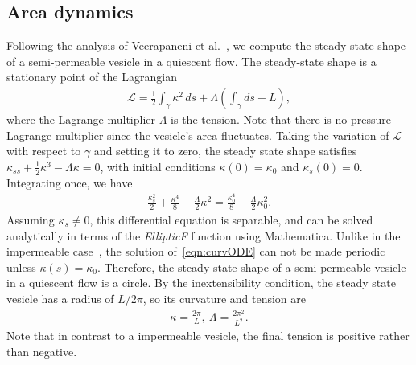 \documentclass[9pt,twocolumn,twoside,lineno]{pnas-new}
\begin{document}
\subsection*{Area dynamics}
Following the analysis of Veerapaneni et al.~\cite{vee-raj-bir-pur2009},
we compute the steady-state shape of a semi-permeable vesicle in a
quiescent flow. The steady-state shape is a stationary point of the
Lagrangian
\begin{align}
  \mathcal{L} = \frac{1}{2}\int_{\gamma} \kappa^2 \, ds +
    \Lambda \left(\int_{\gamma} ds  - L \right),
\end{align}
where the Lagrange multiplier $\Lambda$ is the tension. Note that there
is no pressure Lagrange multiplier since the vesicle's area fluctuates.
Taking the variation of $\mathcal{L}$ with respect to $\gamma$ and
setting it to zero, the steady state shape satisfies $\kappa_{ss} +
\frac{1}{2}\kappa^3 - \Lambda \kappa = 0$, with initial conditions
$\kappa(0) = \kappa_0$ and $\kappa_s(0) = 0$.  Integrating once, we have
\begin{align}
  \frac{\kappa_s^2}{2} + \frac{\kappa^4}{8} - 
    \frac{\Lambda}{2}\kappa^2 = \frac{\kappa_0^4}{8} - 
    \frac{\Lambda}{2}\kappa_0^2.
  \label{eqn:curvODE}
\end{align}
Assuming $\kappa_s \neq 0$, this differential equation is separable, and
can be solved analytically in terms of the {\em EllipticF} function
using Mathematica. Unlike in the impermeable
case~\cite{vee-raj-bir-pur2009}, the solution of~\eqref{eqn:curvODE} can
not be made periodic unless $\kappa(s) = \kappa_0$. Therefore, the
steady state shape of a semi-permeable vesicle in a quiescent flow is a
circle. By the inextensibility condition, the steady state vesicle has a
radius of $L/2\pi$, so its curvature and tension are
\begin{align}
  \kappa = \frac{2\pi}{L}, \: \Lambda = \frac{2\pi^2}{L^2}.
  \label{eqn:SSshape}
\end{align}
Note that in contrast to a impermeable vesicle, the final tension is
positive rather than negative.
\end{document}
